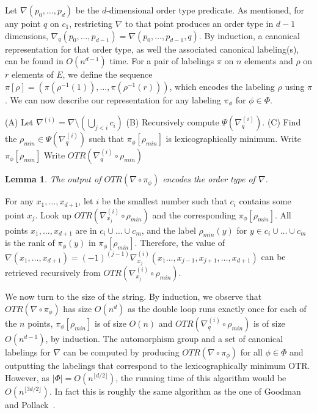 \documentclass[leqno,12pt]{article}
\newtheorem{lemma}{Lemma}
\newenvironment{proof}{\unskip{\bf Proof:}}{\unskip{\hfill $\Box$}}
\def\qed{\unskip{\hfill $\Box$}}
\begin{document}
Let $\nabla(p_0,\ldots,p_d)$ be the $d$-dimensional order type predicate.
As mentioned, for any point $q$ on $c_1$, restricting $\nabla$ to that
point produces an order type in $d{-}1$
dimensions, $\nabla_{q}(p_0,\ldots,p_{d-1})=\nabla(p_0,\ldots,p_{d-1},q)$.
By induction, a canonical representation for that order type, as well the associated canonical labeling(s), can be
found in $O(n^{d{-}1})$ time.
For a pair of labelings $\pi$ on $n$ elements and  $\rho$ on $r$
elements of $E$, we define the sequence
$\pi[\rho] = (\pi(\rho^{-1}(1)),\ldots,\pi(\rho^{-1}(r)))$, which
encodes the labeling $\rho$ using $\pi$.
We can now describe our representation for any labeling 
$\pi_\phi$ for $\phi\in\Phi$.

\begin{algorithmic}
\State   (A) Let $\nabla^{(i)} = \nabla\setminus(\bigcup_{j<i}c_i)$ 
\State      (B) Recursively compute $\Psi(\nabla^{(i)}_q)$.
\State      (C) Find the $\rho_{min}\in\Psi(\nabla^{(i)}_q)$ such that $\pi_\phi[\rho_{min}]$ is lexicographically minimum.
\State     Write $\pi_\phi[\rho_{min}]$
\State      Write $OTR(\nabla^{(i)}_q\circ\rho_{min})$
\EndFor
\EndFor
\EndFunction
\end{algorithmic}

\begin{lemma} 
The output of $OTR(\nabla \circ \pi_\phi)$ encodes the order type of
$\nabla$.
\end{lemma}
\begin{proof}
For any $x_1,\ldots,x_{d+1}$, let $i$ be the smallest number such that
$c_i$ contains some point $x_j$. Look up
$OTR(\nabla^{(i)}_{x_j}\circ\rho_{min})$ and the corresponding 
$\pi_\phi[\rho_{min}]$. All points $x_1,\ldots,x_{d+1}$ are in 
$c_i\cup\ldots\cup c_m$, and the label $\rho_{min}(y)$ for 
$y\in c_i\cup\ldots\cup c_m$ is the rank of
$\pi_\phi(y)$ in $\pi_\phi[\rho_{min}]$. 
Therefore, the value of 
$\nabla(x_1,\ldots,x_{d+1}) =
(-1)^{(j-1)}\nabla^{(i)}_{x_j}(x_1\ldots,x_{j-1},x_{j+1},\ldots,x_{d+1})$
can be retrieved recursively from $OTR(\nabla^{(i)}_{x_j}\circ\rho_{min})$.
\qed\end{proof}

We now turn to the size of the string. 
By induction, we observe that
$OTR(\nabla \circ \pi_\phi)$ has size $O(n^d)$ as the double loop runs
exactly once for each of the $n$ points, $\pi_\phi[\rho_{min}]$ is of
size $O(n)$ and $OTR(\nabla^{(i)}_q\circ\rho_{min})$ is of size
$O(n^{d-1})$, by induction.  The automorphism group and a set of
canonical labelings for $\nabla$ can be computed by producing
$OTR(\nabla \circ \pi_\phi)$ for all $\phi\in\Phi$ and outputting the
labelings that correspond to the lexicographically minimum OTR.
However, as $|\Phi| = O(n^{\lfloor d/2\rfloor})$, the running time of
this algorithm would be $O(n^{\lfloor 3d/2\rfloor})$. In fact this is
roughly the same algorithm as the one of Goodman and Pollack~\cite{goodman_pollack_83_sorting}.
\end{document}
